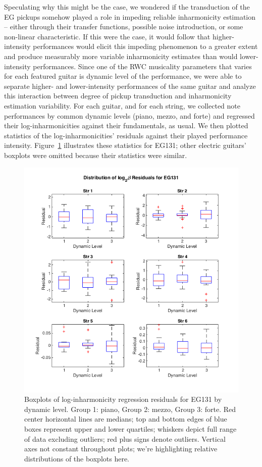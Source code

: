 \documentclass[12pt]{cmuthesis}
\begin{document}
Speculating why this might be the case, we wondered if the transduction of the EG pickups somehow played a role in impeding reliable inharmonicity estimation -- either through their transfer functions, possible noise introduction, or some non-linear characteristic. If this were the case, it would follow that higher-intensity performances would elicit this impeding phenomenon to a greater extent and produce measurably more variable inharmonicity estimates than would lower-intensity performances. Since one of the RWC musicality parameters that varies for each featured guitar is dynamic level of the performance, we were able to separate higher- and lower-intensity performances of the same guitar and analyze this interaction between degree of pickup transduction and inharmonicity estimation variability. For each guitar, and for each string, we collected note performances by common dynamic levels (piano, mezzo, and forte) and regressed their log-inharmonicities against their fundamentals, as usual. We then plotted statistics of the log-inharmonicities' residuals against their played performance intensity. Figure~\ref{fig:eg1-string-dyn} illustrates these statistics for EG131; other electric guitars' boxplots were omitted because their statistics were similar.
\begin{figure}[!htbp] 
\centering
\includegraphics[scale=0.75]{eg1-string-dyn}
\caption{Boxplots of log-inharmonicity regression residuals for EG131 by dynamic level. Group 1: piano, Group 2: mezzo, Group 3: forte. Red center horizontal lines are medians; top and bottom edges of blue boxes represent upper and lower quartiles; whiskers depict full range of data excluding outliers; red plus signs denote outliers. Vertical axes not constant throughout plots; we're highlighting relative distributions of the boxplots here.}
\label{fig:eg1-string-dyn}
\end{figure} 
\end{document}
